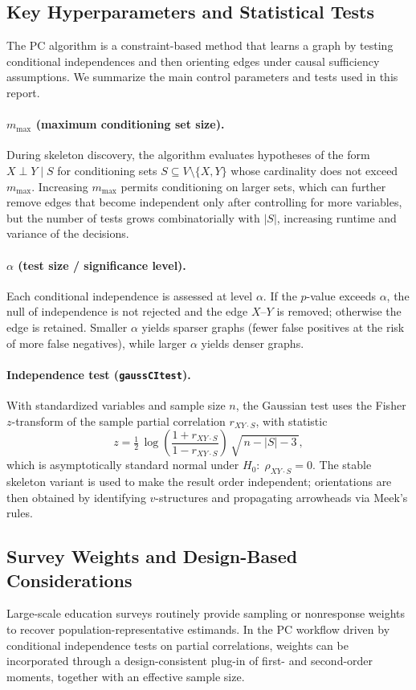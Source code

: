 \documentclass[11pt]{article}
\begin{document}
\subsection{Key Hyperparameters and Statistical Tests}
The PC algorithm is a constraint-based method that learns a graph by testing conditional independences and then orienting edges under causal sufficiency assumptions. We summarize the main control parameters and tests used in this report.

\paragraph{$m_{\max}$ (maximum conditioning set size).} During skeleton discovery, the algorithm evaluates hypotheses of the form $X \perp Y \mid S$ for conditioning sets $S \subseteq V\setminus\{X,Y\}$ whose cardinality does not exceed $m_{\max}$. Increasing $m_{\max}$ permits conditioning on larger sets, which can further remove edges that become independent only after controlling for more variables, but the number of tests grows combinatorially with $|S|$, increasing runtime and variance of the decisions.

\paragraph{$\alpha$ (test size / significance level).} Each conditional independence is assessed at level $\alpha$. If the $p$-value exceeds $\alpha$, the null of independence is not rejected and the edge $X$--$Y$ is removed; otherwise the edge is retained. Smaller $\alpha$ yields sparser graphs (fewer false positives at the risk of more false negatives), while larger $\alpha$ yields denser graphs.

\paragraph{Independence test (\texttt{gaussCItest}).} With standardized variables and sample size $n$, the Gaussian test uses the Fisher $z$-transform of the sample partial correlation $r_{XY\cdot S}$, with statistic
\[
  z = \tfrac{1}{2}\,\log\!\left(\frac{1+r_{XY\cdot S}}{1-r_{XY\cdot S}}\right)\,\sqrt{\,n - |S| - 3\,},
\]
which is asymptotically standard normal under $H_0\!:\;\rho_{XY\cdot S}=0$. The stable skeleton variant is used to make the result order independent; orientations are then obtained by identifying $v$-structures and propagating arrowheads via Meek's rules.

\subsection{Survey Weights and Design-Based Considerations}
Large-scale education surveys routinely provide sampling or nonresponse weights to recover population-representative estimands. In the PC workflow driven by conditional independence tests on partial correlations, weights can be incorporated through a design-consistent plug-in of first- and second-order moments, together with an effective sample size.
\end{document}
